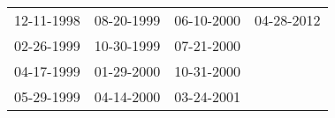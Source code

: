\begin{supertabular}{llll}
 12-11-1998 &  08-20-1999 &  06-10-2000 &  04-28-2012 \\
 02-26-1999 &  10-30-1999 &  07-21-2000 &             \\
 04-17-1999 &  01-29-2000 &  10-31-2000 &             \\
 05-29-1999 &  04-14-2000 &  03-24-2001 &             \\
\end{supertabular}
